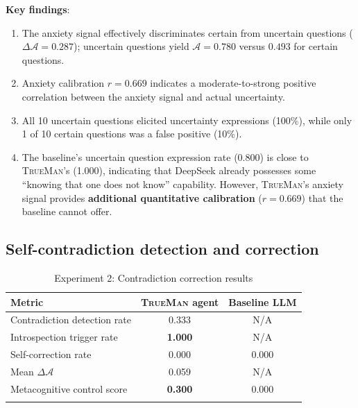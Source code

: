 \documentclass[pdflatex,sn-mathphys-num]{sn-jnl}
\newcommand{\TrueMan}{\textsc{TrueMan}}
\newcommand{\anxiety}{\mathcal{A}}
\theoremstyle{thmstyleone}%
\theoremstyle{thmstyletwo}%
\theoremstyle{thmstylethree}%
\begin{document}
\textbf{Key findings}:
\begin{enumerate}[leftmargin=2em]
    \item The anxiety signal effectively discriminates certain from uncertain questions ($\Delta\anxiety = 0.287$); uncertain questions yield $\anxiety = 0.780$ versus $0.493$ for certain questions.
    \item Anxiety calibration $r = 0.669$ indicates a moderate-to-strong positive correlation between the anxiety signal and actual uncertainty.
    \item All 10 uncertain questions elicited uncertainty expressions (100\%), while only 1 of 10 certain questions was a false positive (10\%).
    \item The baseline's uncertain question expression rate (0.800) is close to \TrueMan{}'s (1.000), indicating that DeepSeek already possesses some ``knowing that one does not know'' capability. However, \TrueMan{}'s anxiety signal provides \textbf{additional quantitative calibration} ($r = 0.669$) that the baseline cannot offer.
\end{enumerate}

\subsection{Self-contradiction detection and correction}

\begin{table}[h]
\caption{Experiment 2: Contradiction correction results}\label{tab:exp2_results}%
\begin{tabular}{@{}lcc@{}}
\toprule
Metric & \TrueMan{} agent & Baseline LLM \\
\midrule
Contradiction detection rate & 0.333 & N/A\footnotemark[1] \\
Introspection trigger rate & \textbf{1.000} & N/A\footnotemark[1] \\
Self-correction rate & 0.000 & 0.000 \\
Mean $\Delta\anxiety$ & 0.059 & N/A\footnotemark[1] \\
\midrule
Metacognitive control score & \textbf{0.300} & 0.000 \\
\botrule
\end{tabular}
\end{table}
\end{document}
